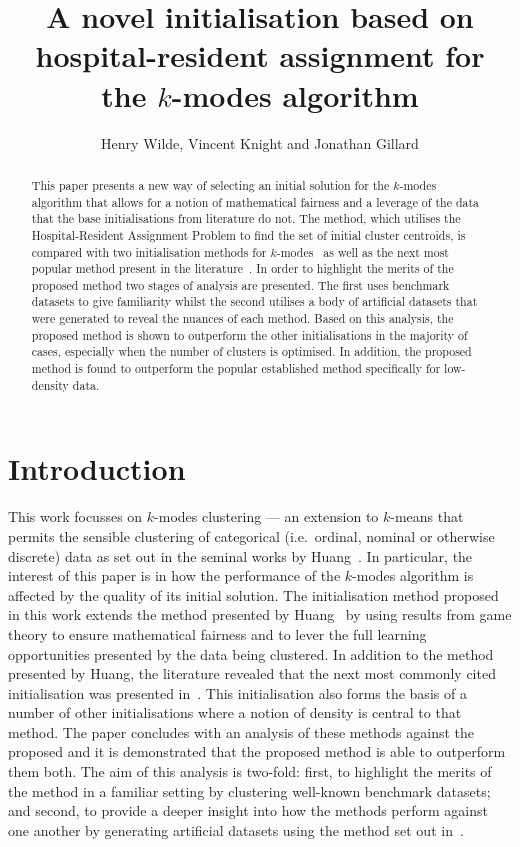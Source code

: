 \documentclass[11pt]{article}
\title{%
    A novel initialisation based on hospital-resident assignment for the
    \(k\)-modes algorithm
}
\author{Henry Wilde, Vincent Knight and Jonathan Gillard}
\begin{document}
\maketitle%
\begin{abstract}
    This paper presents a new way of selecting an initial solution for the
    \(k\)-modes algorithm that allows for a notion of mathematical fairness and
    a leverage of the data that the base initialisations from literature do
    not. The method, which utilises the Hospital-Resident Assignment Problem to
    find the set of initial cluster centroids, is compared with two
    initialisation methods for \(k\)-modes~\cite{Cao2009} as well as the 
    next most popular method present in the literature~\cite{Huang1998}. In
    order to highlight the merits of the proposed method two stages of analysis
    are presented. The first uses benchmark datasets to give familiarity whilst
    the second utilises a body of artificial datasets that were generated to
    reveal the nuances of each method. Based on this analysis, the proposed
    method is shown to outperform the other initialisations in the majority of
    cases, especially when the number of clusters is optimised. In addition, the
    proposed method is found to outperform the popular established method
    specifically for low-density data.
\end{abstract}

\section{Introduction}\label{sec:intro}

This work focusses on \(k\)-modes clustering --- an extension to
\(k\)-means that permits the sensible clustering of categorical (i.e.\ ordinal,
nominal or otherwise discrete) data as set out in the seminal works by
Huang~\cite{Huang1997a,Huang1997b,Huang1998}. In particular, the interest of
this paper is in how the performance of the \(k\)-modes algorithm is affected by
the quality of its initial solution. The initialisation method proposed in this
work extends the method presented by Huang~\cite{Huang1998} by using results
from game theory to ensure mathematical fairness and to lever the full learning
opportunities presented by the data being clustered. In addition to the method
presented by Huang, the literature revealed that the next most commonly cited
initialisation was presented in~\cite{Cao2009}. This initialisation also forms
the basis of a number of other initialisations where a notion of density is
central to that method. The paper concludes with an analysis of these methods
against the proposed and it is demonstrated that the proposed method is able to
outperform them both. The aim of this analysis is two-fold: first, to highlight
the merits of the method in a familiar setting by clustering well-known
benchmark datasets; and second, to provide a deeper insight into how the methods
perform against one another by generating artificial datasets using the method
set out in~\cite{Wilde2019}.
\end{document}
